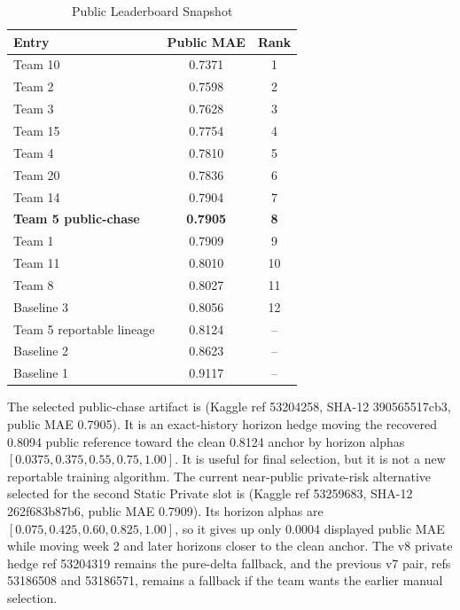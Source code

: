 \documentclass[conference]{IEEEtran}
\begin{document}
\begin{table}[h]
\centering
\caption{Public Leaderboard Snapshot}
\label{tab:leaderboard}
\footnotesize
\begin{tabular}{lcc}
\hline
\textbf{Entry} & \textbf{Public MAE} & \textbf{Rank} \\
\hline
Team 10 & 0.7371 & 1 \\
Team 2 & 0.7598 & 2 \\
Team 3 & 0.7628 & 3 \\
Team 15 & 0.7754 & 4 \\
Team 4 & 0.7810 & 5 \\
Team 20 & 0.7836 & 6 \\
Team 14 & 0.7904 & 7 \\
\textbf{Team 5 public-chase} & \textbf{0.7905} & \textbf{8} \\
Team 1 & 0.7909 & 9 \\
Team 11 & 0.8010 & 10 \\
Team 8 & 0.8027 & 11 \\
Baseline 3 & 0.8056 & 12 \\
Team 5 reportable lineage & 0.8124 & -- \\
Baseline 2 & 0.8623 & -- \\
Baseline 1 & 0.9117 & -- \\
\hline
\end{tabular}
\end{table}

The selected public-chase artifact is
(Kaggle ref 53204258, SHA-12 390565517cb3, public MAE 0.7905). It is an
exact-history horizon hedge moving the recovered 0.8094 public reference toward
the clean 0.8124 anchor by horizon alphas
$[0.0375,0.375,0.55,0.75,1.00]$. It is useful for final selection, but it is
not a new reportable training algorithm. The current near-public private-risk
alternative selected for the second Static Private slot is
(Kaggle ref 53259683, SHA-12 262f683b87b6, public MAE 0.7909). Its horizon
alphas are $[0.075,0.425,0.60,0.825,1.00]$, so it gives up only 0.0004
displayed public MAE while moving week 2 and later horizons closer to the clean
anchor. The v8 private hedge ref 53204319 remains the pure-delta fallback, and
the previous v7 pair, refs 53186508 and 53186571, remains a fallback if the
team wants the earlier manual selection.
\end{document}
